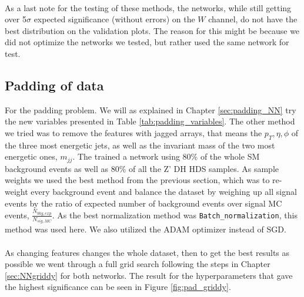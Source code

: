 \documentclass[12pt, a4paper]{book}
\begin{document}
\\As a last note for the testing of these methods, the networks, while still getting over 5$\sigma$ expected significance (without errors) on the $W$ channel, do not have the best distribution on the validation plots. The reason for this might be because 
we did not optimize the networks we tested, but rather used the same network for test. 
\clearpage


\subsection{Padding of data}\label{sec:padding_NN_res}
For the padding problem. We will as explained in Chapter \ref{sec:padding_NN} try the new variables presented in Table \ref{tab:padding_variables}. The other method we tried was to remove the features with jagged arrays, that means the $p_T, \eta, \phi$ of the three most energetic jets, as well as the invariant mass of the two most energetic ones, $m_{jj}$.
The trained a network using 80\% of the whole SM background events as well as 80\% of all the Z' DH HDS samples. As sample weights we used the best method from the previous section, which was to re-weight every background event and balance the dataset by weighing up all signal events by the ratio of expected number of background events over signal MC events, $\frac{N_{bkg,exp}}{N_{sig,MC}}$. 
As the best normalization method was \verb|Batch_normalization|, this method was used here. We also utilized the ADAM optimizer instead of SGD.\\
\\As changing features changes the whole dataset, then to get the best results as possible we went through a full grid search following the steps in Chapter \ref{sec:NNgriddy} for both networks. The result for the hyperparameters that gave the highest significance can be seen in Figure \ref{fig:pad_griddy}.
\graphicspath{{../../../Plots/NeuralNetwork/Padding/}}
\end{document}
